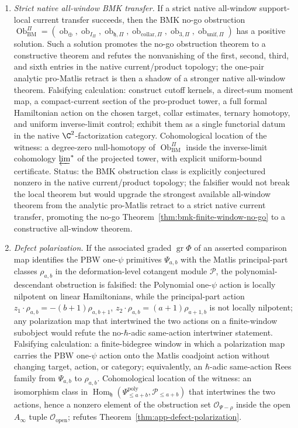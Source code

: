 \begin{enumerate}
\item[\((F7)\)] \emph{Strict native all-window BMK transfer.}
  If a strict native all-window support-local current transfer
  succeeds, then the BMK no-go obstruction
  \(\operatorname{Ob}^{\Pi}_{\mathrm{BM}}=
  (\operatorname{ob}_\oplus,\operatorname{ob}_{I_\Pi},
  \operatorname{ob}_{\mathfrak h,\Pi},\operatorname{ob}_{\mathrm{collar},\Pi},
  \operatorname{ob}_{3,\Pi},\operatorname{ob}_{\mathrm{unif},\Pi})\)
  has a positive solution.  Such a solution promotes the no-go
  obstruction theorem to a constructive theorem and refutes the
  nonvanishing of the first, second, third, and sixth entries in the
  native current/product topology; the one-pair analytic pro-Matlis
  retract is then a shadow of a stronger native all-window theorem.
  Falsifying calculation: construct cutoff kernels, a direct-sum
  moment map, a compact-current section of the pro-product tower, a
  full formal Hamiltonian action on the chosen target, collar
  estimates, ternary homotopy, and uniform inverse-limit control;
  exhibit them as a single functorial datum in the native
  \(\C^2\)-factorization category.
  Cohomological location of the witness: a degree-zero null-homotopy of
  \(\operatorname{Ob}^{\Pi}_{\mathrm{BM}}\) inside the inverse-limit
  cohomology \(\varprojlim^*\) of the projected tower, with explicit
  uniform-bound certificate.
  Status: the BMK obstruction class is explicitly conjectured nonzero
  in the native current/product topology; the falsifier would not
  break the local theorem but would upgrade the strongest available
  all-window theorem from the analytic pro-Matlis retract to a strict
  native current transfer, promoting the no-go
  Theorem~\ref{thm:bmk-finite-window-no-go} to a constructive
  all-window theorem.

\item[\((F8)\)] \emph{Defect polarization.}
  If the associated graded \(\operatorname{gr}\Phi\) of an asserted
  comparison map identifies the PBW one-\(\psi\) primitives
  \(\Psi_{a,b}\) with the Matlis principal-part classes \(\rho_{a,b}\)
  in the deformation-level cotangent module \(\mathcal P\), the
  polynomial-descendant obstruction is falsified: the Polynomial
  one-\(\psi\) action is locally nilpotent on linear Hamiltonians,
  while the principal-part action
  \(z_1\cdot\rho_{a,b}=-(b+1)\rho_{a,b+1}\),
  \(z_2\cdot\rho_{a,b}=(a+1)\rho_{a+1,b}\) is not locally nilpotent;
  any polarization map that intertwined the two actions on a
  finite-window subobject would refute the no-\(\hbar\)-adic
  same-action intertwiner statement.
  Falsifying calculation: a finite-bidegree window in which a
  polarization map carries the PBW one-\(\psi\) action onto the
  Matlis coadjoint action without changing target, action, or
  category; equivalently, an \(\hbar\)-adic same-action Rees family
  from \(\Psi_{a,b}\) to \(\rho_{a,b}\).
  Cohomological location of the witness: an isomorphism class in
  \(\operatorname{Hom}_{\mathfrak h}
  (\Psi^{\mathrm{poly}}_{\le a+b},\mathcal P_{\le a+b})\) that
  intertwines the two actions, hence a nonzero element of the
  obstruction set \(\mathcal O_{\Psi-\rho}\) inside the open
  \(A_\infty\) tuple \(\mathcal O_{\mathrm{open}}\); refutes
  Theorem~\ref{thm:app-defect-polarization}.


\end{enumerate}

